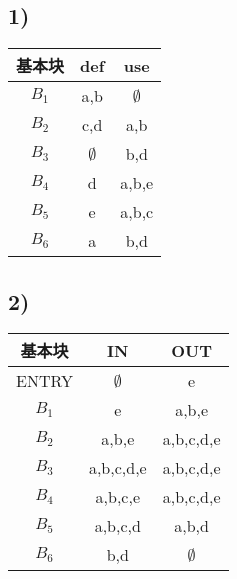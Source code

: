 \documentclass[11pt]{article}
\begin{document}
\subsection*{1)}
\begin{table}[H]
\centering
\begin{tabular}{|c|c|c|}
	\hline
	\textbf{基本块} & \textbf{def} & \textbf{use} \\ \hline
	$B_1$ & a,b & $\emptyset$ \\ \hline
	$B_2$ & c,d & a,b \\ \hline
	$B_3$ & $\emptyset$ & b,d \\ \hline
	$B_4$ & d & a,b,e \\ \hline
	$B_5$ & e & a,b,c \\ \hline
	$B_6$ & a & b,d \\ \hline
\end{tabular}
\end{table}
\subsection*{2)}
\begin{table}[H]
\centering
\begin{tabular}{|c|c|c|}
	\hline
	\textbf{基本块} & \textbf{IN} & \textbf{OUT} \\ \hline
	ENTRY & $\emptyset$ & e  \\ \hline
	$B_1$ & e & a,b,e \\ \hline
	$B_2$ & a,b,e & a,b,c,d,e \\ \hline
	$B_3$ & a,b,c,d,e & a,b,c,d,e \\ \hline
	$B_4$ & a,b,c,e & a,b,c,d,e \\ \hline
	$B_5$ & a,b,c,d & a,b,d \\ \hline
	$B_6$ & b,d & $\emptyset$ \\ \hline
\end{tabular}
\end{table}
\end{document}
